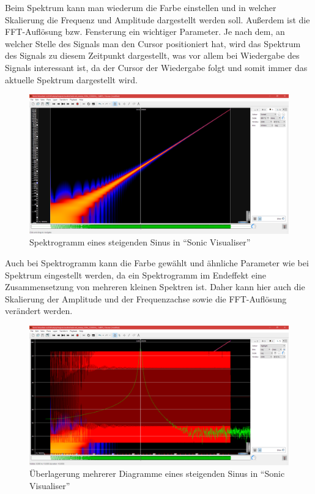 \documentclass[a4paper]{article}
\begin{document}
\noindent
Beim Spektrum kann man wiederum die Farbe einstellen und in welcher Skalierung die Frequenz und Amplitude dargestellt werden soll. Außerdem ist die FFT-Auflösung bzw. Fensterung ein wichtiger Parameter. Je nach dem, an welcher Stelle des Signals man den Cursor positioniert hat, wird das Spektrum des Signals zu diesem Zeitpunkt dargestellt, was vor allem bei Wiedergabe des Signals interessant ist, da der Cursor der Wiedergabe folgt und somit immer das aktuelle Spektrum dargestellt wird.
\vspace{2em}
\begin{figure}[H]
    \centering
    \begin{minipage}{1.0\textwidth}
        \centering
        \includegraphics[width=1.0\textwidth]{Sonic_Sine_Sweep_Spectrogram.png}
        \caption{Spektrogramm eines steigenden Sinus in "`Sonic Visualiser"'}
    \end{minipage}
\end{figure}
\noindent
Auch bei Spektrogramm kann die Farbe gewählt und ähnliche Parameter wie bei Spektrum eingestellt werden, da ein Spektrogramm im Endeffekt eine Zusammensetzung von mehreren kleinen Spektren ist. Daher kann hier auch die Skalierung der Amplitude und der Frequenzachse sowie die FFT-Auflösung verändert werden.
\vspace{2em}
\begin{figure}[H]
    \centering
    \begin{minipage}{1.0\textwidth}
        \centering
        \includegraphics[width=1.0\textwidth]{Sonic_Sine_Sweep_overlay.png}
        \caption{Überlagerung mehrerer Diagramme eines steigenden Sinus in "`Sonic Visualiser"'}
    \end{minipage}
\end{figure}
\end{document}
